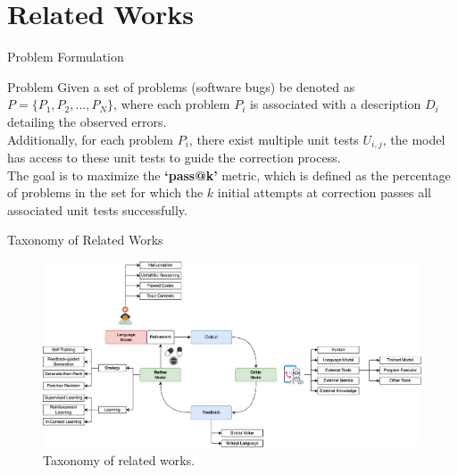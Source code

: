 \section{Related Works}

\begin{frame}{Problem Formulation}
    \begin{block}{Problem}
        Given a set of problems (software bugs) be denoted as \( P = \{P_1, P_2, \ldots, P_N\} \), where each problem \( P_i \) is associated with a description \( D_i \) detailing the observed errors.\\

        Additionally, for each problem \( P_i \), there exist multiple unit tests \( U_{i,j} \), the model has access to these unit tests to guide the correction process.\\
        \vspace{0.5cm}
        The goal is to maximize the \textbf{`pass@k'} metric, which is defined as the percentage of problems in the set for which the $k$ initial attempts at correction passes all associated unit tests successfully.
    \end{block}
\end{frame}

\begin{frame}{Taxonomy of Related Works}
    \begin{figure}
        \centering
        \includegraphics[width=1\textwidth]{img/taxonomy}
        \captionsetup{font=small,labelformat=empty}
        \caption{Taxonomy of related works.}\label{fig:taxonomy}
    \end{figure}
\end{frame}


